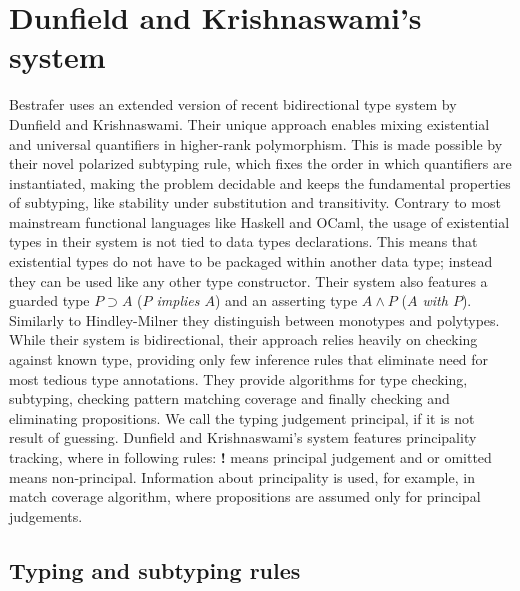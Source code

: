 \documentclass[declaration,shortabstract,english]{iithesis}
\begin{document}
\section{Dunfield and Krishnaswami's system}
Bestrafer uses an extended version of recent bidirectional type system by Dunfield and Krishnaswami\cite{gadt-popl19}.
Their unique approach enables mixing existential and universal quantifiers in higher-rank polymorphism. This is made possible by
their novel polarized subtyping rule, which fixes the order in which quantifiers are instantiated, making the
problem decidable and keeps the fundamental properties of subtyping, like stability under substitution and transitivity.
Contrary to most mainstream functional languages like Haskell and OCaml,
the usage of existential types in their system is not tied to data types declarations. This means that existential types
do not have to be packaged within another data type; instead they can be used like any other type constructor.
Their system also features a guarded type $P \supset A $ (\textit{$P$ implies $A$})
and an asserting type $A \wedge  P$ (\textit{$A$ with $P$}).
Similarly to Hindley-Milner they distinguish between monotypes and polytypes.
While their system is bidirectional, their approach relies heavily on checking against known type, providing only few inference
rules that eliminate need for most tedious type annotations.
They provide algorithms for type checking, subtyping, checking pattern matching coverage and finally checking and eliminating propositions.
We call the typing judgement principal, if it is not result of guessing. Dunfield and Krishnaswami's system features principality tracking,
where in following rules: \textbf{!} means principal judgement and \cancel{\textbf{!}} or omitted means non-principal.
Information about principality is used, for example, in match coverage algorithm, where propositions are assumed only
for principal judgements.
\subsection*{Typing and subtyping rules}
\end{document}
